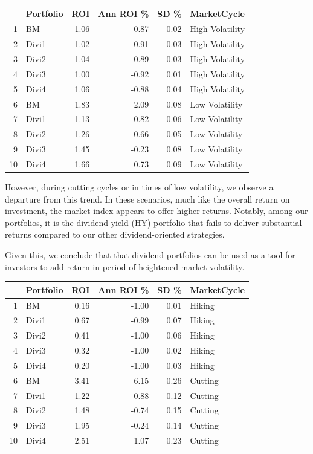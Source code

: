 \documentclass[10pt,preprint, authoryear]{elsarticle}
\let\origtable\table
\let\endorigtable\endtable
\renewenvironment{table}[1][2] {
    \expandafter\origtable\expandafter[H]
} {
    \endorigtable
}
\numberwithin{equation}{section}
\numberwithin{figure}{section}
\numberwithin{table}{section}
\begin{document}
\begin{table}[H]
\centering
\begin{tabular}{rlrrrl}
  \hline
 & Portfolio & ROI & Ann ROI \% & SD \% & MarketCycle \\ 
  \hline
1 & BM & 1.06 & -0.87 & 0.02 & High Volatility  \\ 
  2 & Divi1 & 1.02 & -0.91 & 0.03 & High Volatility  \\ 
  3 & Divi2 & 1.04 & -0.89 & 0.03 & High Volatility  \\ 
  4 & Divi3 & 1.00 & -0.92 & 0.01 & High Volatility  \\ 
  5 & Divi4 & 1.06 & -0.88 & 0.04 & High Volatility  \\ 
  6 & BM & 1.83 & 2.09 & 0.08 & Low Volatility  \\ 
  7 & Divi1 & 1.13 & -0.82 & 0.06 & Low Volatility  \\ 
  8 & Divi2 & 1.26 & -0.66 & 0.05 & Low Volatility  \\ 
  9 & Divi3 & 1.45 & -0.23 & 0.08 & Low Volatility  \\ 
  10 & Divi4 & 1.66 & 0.73 & 0.09 & Low Volatility  \\ 
   \hline
\end{tabular}
\caption{Market Cycle Perforomance \label{tab3} } 
\end{table}

However, during cutting cycles or in times of low volatility, we observe
a departure from this trend. In these scenarios, much like the overall
return on investment, the market index appears to offer higher returns.
Notably, among our portfolios, it is the dividend yield (HY) portfolio
that fails to deliver substantial returns compared to our other
dividend-oriented strategies.

Given this, we conclude that that dividend portfolios can be used as a
tool for investors to add return in period of heightened market
volatility.

\begin{table}[H]
\centering
\begin{tabular}{rlrrrl}
  \hline
 & Portfolio & ROI & Ann ROI \% & SD \% & MarketCycle \\ 
  \hline
1 & BM & 0.16 & -1.00 & 0.01 & Hiking \\ 
  2 & Divi1 & 0.67 & -0.99 & 0.07 & Hiking \\ 
  3 & Divi2 & 0.41 & -1.00 & 0.06 & Hiking \\ 
  4 & Divi3 & 0.32 & -1.00 & 0.02 & Hiking \\ 
  5 & Divi4 & 0.20 & -1.00 & 0.03 & Hiking \\ 
  6 & BM & 3.41 & 6.15 & 0.26 & Cutting \\ 
  7 & Divi1 & 1.22 & -0.88 & 0.12 & Cutting \\ 
  8 & Divi2 & 1.48 & -0.74 & 0.15 & Cutting \\ 
  9 & Divi3 & 1.95 & -0.24 & 0.14 & Cutting \\ 
  10 & Divi4 & 2.51 & 1.07 & 0.23 & Cutting \\ 
   \hline
\end{tabular}
\caption{Interest Rate Regime Performance \label{tab4}} 
\end{table}
\end{document}
